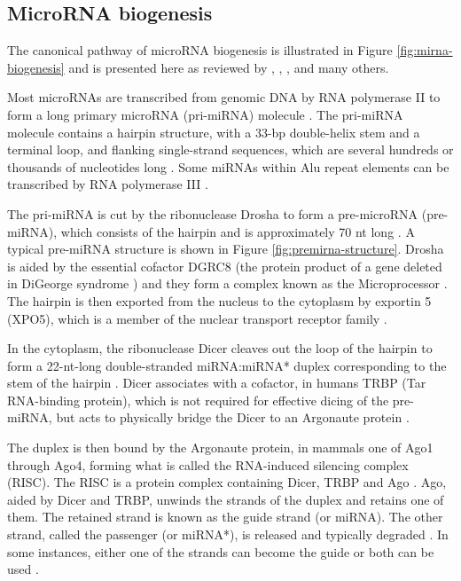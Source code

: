 



\subsection{MicroRNA biogenesis}\label{microrna-biogenesis}

The canonical pathway of microRNA biogenesis is illustrated in Figure
\ref{fig:mirna-biogenesis} and is presented here as reviewed by \citet{Bartel2004},
\citet{Melo2011}, \citet{Ha2014}, and many others. 

Most microRNAs are transcribed from genomic DNA by RNA polymerase II to form a
long primary microRNA (pri-miRNA) molecule \citep{Lee2004}. The pri-miRNA molecule
contains a hairpin structure, with a 33-bp double-helix stem and a terminal
loop, and flanking single-strand sequences, which are several hundreds or
thousands of nucleotides long \citep{Kim2005}. Some miRNAs within Alu repeat elements
can be transcribed by RNA polymerase III \citep{Borchert2006}.

The pri-miRNA is cut by the ribonuclease Drosha to form %
a pre-microRNA (pre-miRNA), which consists of the hairpin and is
approximately 70 nt long \citep{Lee2003}. A typical pre-miRNA structure is
shown in Figure \ref{fig:premirna-structure}. Drosha is aided by the essential
cofactor DGRC8 (the protein product of a gene deleted in DiGeorge syndrome \citep{Shiohama2003})
and they form a complex known as the Microprocessor \citep{Gregory2004}.
The hairpin is
then exported from the nucleus to the cytoplasm by exportin 5 (XPO5), which is
a member of the nuclear transport receptor family \citep{Lund2004}.

In the cytoplasm, the ribonuclease Dicer cleaves out the loop of the hairpin
to form a 22-nt-long double-stranded miRNA:miRNA* duplex corresponding to
the stem of the hairpin \citep{Bernstein2001}.
Dicer associates with a cofactor, in humans TRBP (Tar RNA-binding protein),
which is not required for effective dicing of the pre-miRNA,
but acts to physically bridge the Dicer to an Argonaute protein
\citep{Chendrimada2005}.

The duplex is then bound by the Argonaute protein, in mammals one of Ago1
through Ago4, forming what is called the RNA-induced silencing complex (RISC).
The RISC is a protein complex containing Dicer, TRBP and Ago \citep{Gregory2005}.
Ago, aided by Dicer and TRBP, unwinds the strands of the duplex and retains one of
them. The retained strand is known as the guide strand (or miRNA). The other
strand, called the passenger (or miRNA*), is released and typically degraded \citep{Du2005}.
In some instances, either one of the strands can become the guide
or both can be used \citep{Czech2009}.

